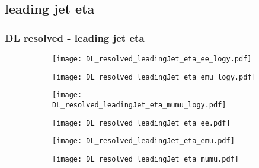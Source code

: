 \documentclass[aspectratio=169,8pt]{beamer}
\begin{document}
\subsection{leading jet eta}
\begin{frame}
\frametitle{DL resolved - leading jet eta}
\begin{figure}
\captionsetup[subfigure]{labelformat=empty}
\begin{subfigure}{0.32\textwidth}
\texttt{[image: DL\_resolved\_leadingJet\_eta\_ee\_logy.pdf]}
\vspace*{-0.15cm}
\end{subfigure}
\hfil
\begin{subfigure}{0.32\textwidth}
\texttt{[image: DL\_resolved\_leadingJet\_eta\_emu\_logy.pdf]}
\vspace*{-0.15cm}
\end{subfigure}
\hfil
\begin{subfigure}{0.32\textwidth}
\texttt{[image: DL\_resolved\_leadingJet\_eta\_mumu\_logy.pdf]}
\vspace*{-0.15cm}
\end{subfigure}
\hfil
\begin{subfigure}{0.32\textwidth}
\texttt{[image: DL\_resolved\_leadingJet\_eta\_ee.pdf]}
\vspace*{-0.15cm}
\end{subfigure}
\hfil
\begin{subfigure}{0.32\textwidth}
\texttt{[image: DL\_resolved\_leadingJet\_eta\_emu.pdf]}
\vspace*{-0.15cm}
\end{subfigure}
\hfil
\begin{subfigure}{0.32\textwidth}
\texttt{[image: DL\_resolved\_leadingJet\_eta\_mumu.pdf]}
\vspace*{-0.15cm}
\end{subfigure}
\hfil
\end{figure}
\end{frame}
\newpage
\end{document}
